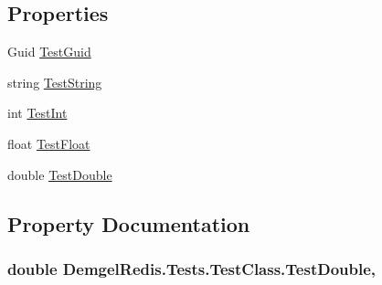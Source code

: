 \subsection*{Properties}
\begin{DoxyCompactItemize}
\item 
Guid \hyperlink{class_demgel_redis_1_1_tests_1_1_test_class_a6d17a9b2258f9b97674102d4c0e50fe2}{Test\+Guid}
\item 
string \hyperlink{class_demgel_redis_1_1_tests_1_1_test_class_a0f441625155e68f40b8cfec35b24890e}{Test\+String}
\item 
int \hyperlink{class_demgel_redis_1_1_tests_1_1_test_class_ad1bcc60fe93e92012a8e76c47321dfdb}{Test\+Int}
\item 
float \hyperlink{class_demgel_redis_1_1_tests_1_1_test_class_aed7bb016ef514b9adb5342d883fc01f1}{Test\+Float}
\item 
double \hyperlink{class_demgel_redis_1_1_tests_1_1_test_class_aaa687fd35d886ac34efb5f9c7f71e241}{Test\+Double}
\end{DoxyCompactItemize}


\subsection{Property Documentation}
\hypertarget{class_demgel_redis_1_1_tests_1_1_test_class_aaa687fd35d886ac34efb5f9c7f71e241}{}
\subsubsection[{Test\+Double}]{\setlength{\rightskip}{0pt plus 5cm}double Demgel\+Redis.\+Tests.\+Test\+Class.\+Test\+Double\hspace{0.3cm}{\ttfamily [get]}, {\ttfamily [set]}}\label{class_demgel_redis_1_1_tests_1_1_test_class_aaa687fd35d886ac34efb5f9c7f71e241}
\hypertarget{class_demgel_redis_1_1_tests_1_1_test_class_aed7bb016ef514b9adb5342d883fc01f1}{}
